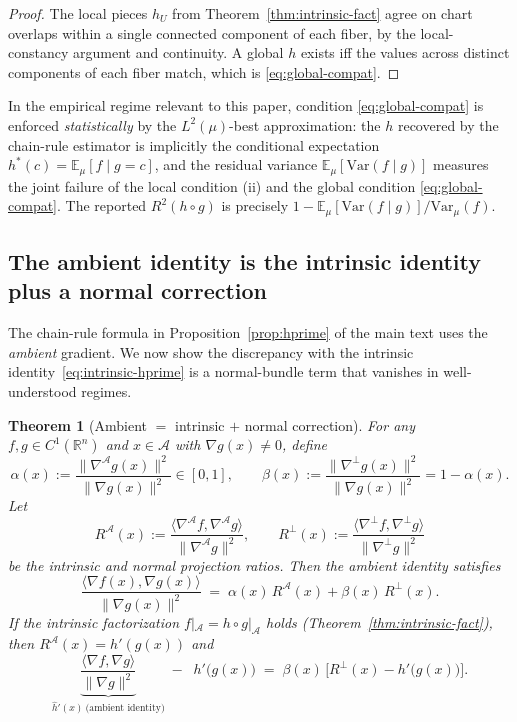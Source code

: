 \documentclass{article}
\newtheorem{theorem}{Theorem}
\begin{document}
\begin{proof}
The local pieces $h_U$ from Theorem~\ref{thm:intrinsic-fact} agree on chart
overlaps within a single connected component of each fiber, by the
local-constancy argument and continuity. A global $h$ exists iff the
values across distinct components of each fiber match, which is
\eqref{eq:global-compat}.
\end{proof}

In the empirical regime relevant to this paper, condition
\eqref{eq:global-compat} is enforced \emph{statistically} by the
$L^2(\mu)$-best approximation: the $h$ recovered by the chain-rule
estimator is implicitly the conditional expectation
$h^\ast(c) = \mathbb{E}_\mu[f \mid g=c]$, and the residual variance
$\mathbb{E}_\mu[\mathrm{Var}(f \mid g)]$ measures the joint failure of
the local condition (ii) and the global condition
\eqref{eq:global-compat}. The reported $R^2(h\circ g)$ is precisely
$1 - \mathbb{E}_\mu[\mathrm{Var}(f\mid g)]/\mathrm{Var}_\mu(f)$.

\subsection{The ambient identity is the intrinsic identity plus a normal correction}

The chain-rule formula in Proposition~\ref{prop:hprime} of the main text
uses the \emph{ambient} gradient. We now show the discrepancy with the
intrinsic identity~\eqref{eq:intrinsic-hprime} is a normal-bundle term
that vanishes in well-understood regimes.

\begin{theorem}[Ambient $=$ intrinsic $+$ normal correction]
\label{thm:amb-int}
For any $f, g\in C^1(\mathbb{R}^n)$ and $x\in\mathcal{A}$ with
$\nabla g(x)\neq 0$, define
$$
  \alpha(x) := \frac{\|\nabla^{\!\mathcal{A}} g(x)\|^2}{\|\nabla g(x)\|^2}
            \in [0,1],
  \qquad
  \beta(x) := \frac{\|\nabla^{\!\perp} g(x)\|^2}{\|\nabla g(x)\|^2}
            = 1-\alpha(x).
$$
Let
$$
  R^{\!\mathcal{A}}(x) := \frac{\langle\nabla^{\!\mathcal{A}} f, \nabla^{\!\mathcal{A}} g\rangle}
                              {\|\nabla^{\!\mathcal{A}} g\|^2},
  \qquad
  R^{\!\perp}(x) := \frac{\langle\nabla^{\!\perp} f, \nabla^{\!\perp} g\rangle}
                          {\|\nabla^{\!\perp} g\|^2}
$$
be the intrinsic and normal projection ratios. Then the ambient identity
satisfies
\begin{equation}
\label{eq:amb-int-decomp}
  \frac{\langle \nabla f(x),\nabla g(x)\rangle}{\|\nabla g(x)\|^2}
  \;=\;
  \alpha(x)\,R^{\!\mathcal{A}}(x)
  + \beta(x)\,R^{\!\perp}(x).
\end{equation}
If the intrinsic factorization $f|_{\mathcal{A}}=h\circ g|_{\mathcal{A}}$
holds (Theorem~\ref{thm:intrinsic-fact}), then $R^{\!\mathcal{A}}(x) = h'(g(x))$ and
\begin{equation}
\label{eq:amb-residual}
  \underbrace{\frac{\langle\nabla f,\nabla g\rangle}{\|\nabla g\|^2}}_{\hat h'(x)\
  \text{(ambient identity)}}
  \;-\;\;
  h'\bigl(g(x)\bigr)
  \;=\; \beta(x)\,\bigl[R^{\!\perp}(x) - h'\bigl(g(x)\bigr)\bigr].
\end{equation}
\end{theorem}
\end{document}
